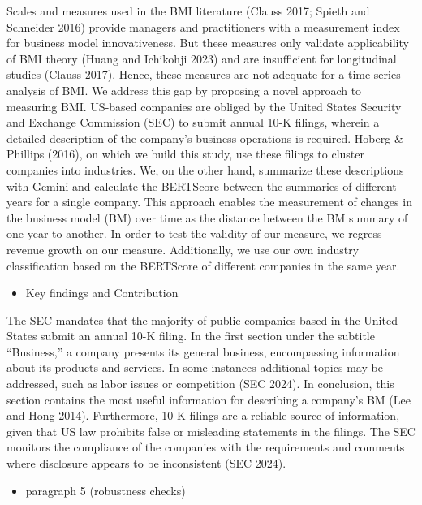 \documentclass[
]{article}
\providecommand{\tightlist}{%
  \setlength{\itemsep}{0pt}\setlength{\parskip}{0pt}}\usepackage{longtable,booktabs,array}
\begin{document}
Scales and measures used in the BMI literature (Clauss 2017; Spieth and
Schneider 2016) provide managers and practitioners with a measurement
index for business model innovativeness. But these measures only
validate applicability of BMI theory (Huang and Ichikohji 2023) and are
insufficient for longitudinal studies (Clauss 2017). Hence, these
measures are not adequate for a time series analysis of BMI. We address
this gap by proposing a novel approach to measuring BMI. US-based
companies are obliged by the United States Security and Exchange
Commission (SEC) to submit annual 10-K filings, wherein a detailed
description of the company's business operations is required. Hoberg \&
Phillips (2016), on which we build this study, use these filings to
cluster companies into industries. We, on the other hand, summarize
these descriptions with Gemini and calculate the BERTScore between the
summaries of different years for a single company. This approach enables
the measurement of changes in the business model (BM) over time as the
distance between the BM summary of one year to another. In order to test
the validity of our measure, we regress revenue growth on our measure.
Additionally, we use our own industry classification based on the
BERTScore of different companies in the same year.

\begin{itemize}
\tightlist
\item
  Key findings and Contribution
\end{itemize}

The SEC mandates that the majority of public companies based in the
United States submit an annual 10-K filing. In the first section under
the subtitle ``Business,'' a company presents its general business,
encompassing information about its products and services. In some
instances additional topics may be addressed, such as labor issues or
competition (SEC 2024). In conclusion, this section contains the most
useful information for describing a company's BM (Lee and Hong 2014).
Furthermore, 10-K filings are a reliable source of information, given
that US law prohibits false or misleading statements in the filings. The
SEC monitors the compliance of the companies with the requirements and
comments where disclosure appears to be inconsistent (SEC 2024).

\begin{itemize}
\tightlist
\item
  paragraph 5 (robustness checks)
\end{itemize}
\end{document}
